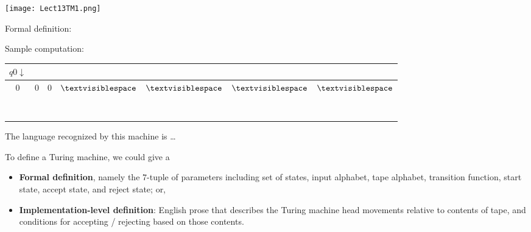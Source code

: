 \documentclass[12pt, oneside]{article}
\begin{document}
\newpage
\begin{multicols}{2}
\texttt{[image: Lect13TM1.png]}

\columnbreak
Formal definition:

\vspace{10pt}

Sample computation: 

\begin{tabular}{|c|c|c|c|c|c|c|}
\hline
\multicolumn{1}{|c}{$q0\downarrow$} &  \multicolumn{6}{c|}{\phantom{A}}\\
\hline
$0$ & $0$  & $0$ & $\textvisiblespace $& $\textvisiblespace $& $\textvisiblespace $&  $\textvisiblespace $\\
\hline
\multicolumn{7}{|c|}{\phantom{A}}\\
\hline
\phantom{AA} & \phantom{AA}& \phantom{AA}& \phantom{AA}& \phantom{AA}& \phantom{AA}& \phantom{AA} \\
\hline
\multicolumn{7}{|c|}{\phantom{A}}\\
\hline
\phantom{AA} & \phantom{AA}& \phantom{AA}& \phantom{AA}& \phantom{AA}& \phantom{AA}& \phantom{AA} \\
\hline
\multicolumn{7}{|c|}{\phantom{A}}\\
\hline
\phantom{AA} & \phantom{AA}& \phantom{AA}& \phantom{AA}& \phantom{AA}& \phantom{AA}& \phantom{AA} \\
\hline
\multicolumn{7}{|c|}{\phantom{A}}\\
\hline
\phantom{AA} & \phantom{AA}& \phantom{AA}& \phantom{AA}& \phantom{AA}& \phantom{AA}& \phantom{AA} \\
\hline
\end{tabular}
\end{multicols}
\vfill

The language recognized by this machine is \ldots

\vfill


To define a Turing machine, we could give a 
\begin{itemize}
\item {\bf Formal definition}, namely the $7$-tuple of parameters including set of states, 
input alphabet, tape alphabet, transition function, start state, accept state, and reject state; or,
\item {\bf Implementation-level definition}: English prose that describes the Turing machine head 
movements relative to contents of tape, and conditions for accepting / rejecting based on those contents.
\end{itemize}
\end{document}

